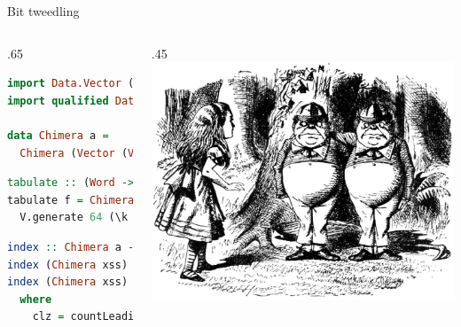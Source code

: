 \documentclass[handout]{beamer}
\begin{document}
\begin{frame}[fragile]{Bit tweedling}

\begin{columns}[T]
  \begin{column}{.65\textwidth}

\begin{lstlisting}[language=Haskell]
import Data.Vector (Vector, (!))
import qualified Data.Vector as V

data Chimera a =
  Chimera (Vector (Vector a))
\end{lstlisting}

\begin{lstlisting}[language=Haskell]
tabulate :: (Word -> a) -> Chimera a
tabulate f = Chimera $ V.singleton (f 0) `V.cons`
  V.generate 64 (\k -> V.generate (2^k) (f . (+ 2^k)))
\end{lstlisting}

\begin{lstlisting}[language=Haskell]
index :: Chimera a -> Word -> a
index (Chimera xss) 0 = xss ! 0 ! 0
index (Chimera xss) n = xss ! (64-clz) ! (n - 2^(63-clz))
  where
    clz = countLeadingZeros n
\end{lstlisting}

\end{column}

\begin{column}{.45\textwidth}
  \vspace{-3ex}
  \includegraphics[width=1.07\textwidth]{tweedledum.png}
\end{column}

\end{columns}

\end{frame}
\end{document}
